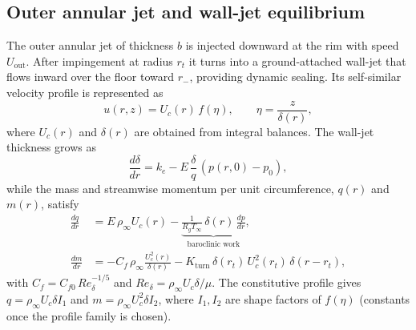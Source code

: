\documentclass[11pt,a4paper]{article}
\begin{document}
\subsection{Outer annular jet and wall-jet equilibrium}
The outer annular jet of thickness $b$ is injected downward at the rim with speed $U_{\mathrm{out}}$. After impingement at radius $r_t$ it turns into a ground-attached wall-jet that flows inward over the floor toward $r_-$, providing dynamic sealing. Its self-similar velocity profile is represented as
\begin{equation}
  u(r,z) = U_c(r)\, f\!\left(\eta\right),\qquad \eta=\frac{z}{\delta(r)} ,
\end{equation}
where $U_c(r)$ and $\delta(r)$ are obtained from integral balances. The wall-jet thickness grows as
\begin{equation}
  \frac{d\delta}{dr} = k_e - E\,\frac{\delta}{q}\,\left(p(r,0)-p_0\right),
\end{equation}
while the mass and streamwise momentum per unit circumference, $q(r)$ and $m(r)$, satisfy
\begin{align}
  \frac{dq}{dr} &= E\,\rho_\infty U_c(r) - \underbrace{\frac{1}{R_g T_\infty}\,\delta(r)\,\frac{dp}{dr}}_{\text{baroclinic work}},\\
  \frac{dm}{dr} &= -C_f\,\rho_\infty \frac{U_c^2(r)}{\delta(r)} - K_{\mathrm{turn}}\,\delta(r_t)\,U_c^2(r_t)\,\delta(r-r_t) ,
\end{align}
with $C_f=C_{f0}\,Re_\delta^{-1/5}$ and $Re_\delta=\rho_\infty U_c\delta/\mu$. The constitutive profile gives $q=\rho_\infty U_c\delta I_1$ and $m=\rho_\infty U_c^2\delta I_2$, where $I_1,I_2$ are shape factors of $f(\eta)$ (constants once the profile family is chosen).
\end{document}
